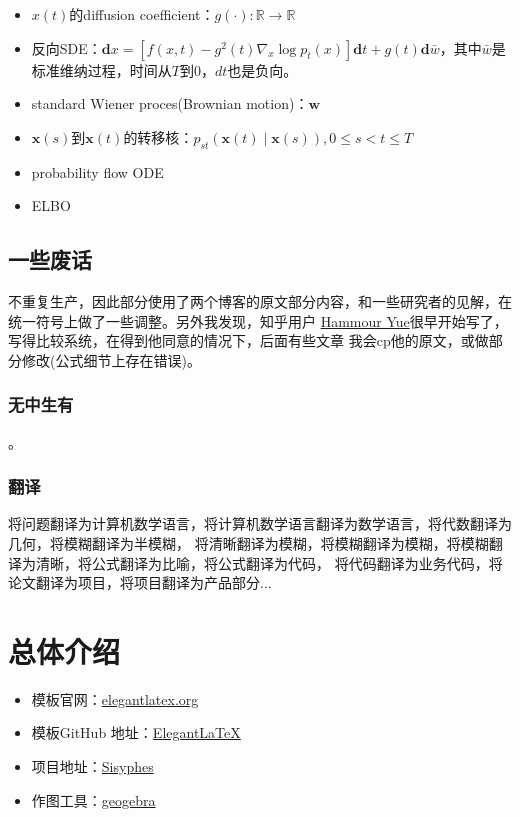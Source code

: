 \documentclass[lang=cn,newtx,10pt,scheme=chinese]{elegantbook}
\begin{document}
\begin{itemize}
    \item $x(t)$的diffusion coefficient：$g(\cdot):\mathbb{R} \rightarrow \mathbb{R}$
    \item 反向SDE：$\mathbf{d} x=\left[f(x, t)-g^2(t) \nabla_x \log p_t(x)\right] \mathbf{d} t+g(t) \mathbf{d} \bar{w}$，其中$\bar{w}$是标准维纳过程，时间从$T$到$0$，$dt$也是负向。
    \item standard Wiener proces(Brownian motion)：$\boldsymbol{w}$
    \item $\mathbf{x}(s)$到$\mathbf{x}(t)$的转移核：$p_{s t}(\mathbf{x}(t) \mid \mathbf{x}(s)),0 \leqslant s<t \leqslant T$
    \item probability flow ODE
    \item ELBO 

\end{itemize}
\section{一些废话}
不重复生产，因此部分使用了两个博客的原文部分内容，和一些研究者的见解，在统一符号上做了一些调整。另外我发现，知乎用户
\href{https://www.zhihu.com/people/bai-e-ji-wan-qi}{Hammour Yue}很早开始写了，写得比较系统，在得到他同意的情况下，后面有些文章
我会cp他的原文，或做部分修改(公式细节上存在错误)。
\subsection{无中生有}
。
\subsection{翻译}
将问题翻译为计算机数学语言，将计算机数学语言翻译为数学语言，将代数翻译为几何，将模糊翻译为半模糊，
将清晰翻译为模糊，将模糊翻译为模糊，将模糊翻译为清晰，将公式翻译为比喻，将公式翻译为代码，
将代码翻译为业务代码，将论文翻译为项目，将项目翻译为产品部分...

\chapter{总体介绍}

\begin{itemize}
  \item 模板官网：\href{https://elegantlatex.org/}{elegantlatex.org}
  \item 模板GitHub 地址：\href{https://github.com/ElegantLaTeX/}{ElegantLaTeX}
  \item 项目地址：\href{https://github.com/foocker}{Sisyphes}
  \item 作图工具：\href{https://www.geogebra.org/?lang=en}{geogebra}
\end{itemize}
\end{document}

